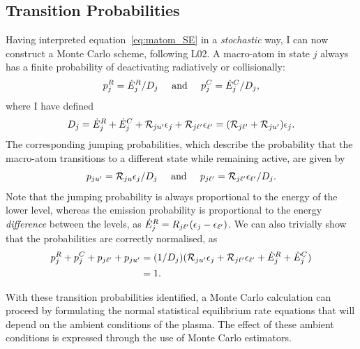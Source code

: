 
\subsection{Transition Probabilities}

Having interpreted equation~\ref{eq:matom_SE} in a {\em stochastic} way,
I can now construct a Monte Carlo scheme, following L02.
A macro-atom in state $j$ always has a finite probability of deactivating
radiatively or collisionally:
\begin{equation}
p_{j}^{R} = \dot{E}_{j}^{R} / D_j \;\;\;\;\; {\rm and} \;\;\;
\;\; p_{j}^{C} = \dot{E}_{j}^{C} / D_j,
\label{eq:deactivate}
\end{equation}
where I have defined
\begin{equation}
D_j =  \dot{E}_{j}^{R}+\dot{E}_{j}^{C}+{\cal R}_{j{u^\prime}}\epsilon_{j}+
 {\cal R}_{j {\ell^\prime}}\epsilon_{{\ell^\prime}} = ({\cal R}_{j{\ell^\prime}} + {\cal R}_{j{u^\prime}}) \epsilon_{j}.
\end{equation}
The corresponding jumping probabilities, which describe the probability
that the macro-atom transitions to a different state while remaining active, 
are given by
\begin{equation}
p_{j{u^\prime}} = {\cal R}_{ju} \epsilon_{j} / D_j \;\;\;\;\; {\rm and} \;\;\;
\;\; p_{j{\ell^\prime}} = {\cal R}_{j{\ell^\prime}} \epsilon_{{\ell^\prime}} / D_j.
\end{equation}
Note that the jumping probability is always proportional to the energy
of the lower level, whereas the emission probability is proportional
to the energy {\em difference} between the levels, as 
$\dot{E}_{j}^{R} = R_{j{\ell^\prime}} (\epsilon_j - \epsilon_{\ell^\prime})$. We can also
trivially show that the probabilities are correctly normalised, as
\begin{align}
p_{j}^{R} + p_{j}^{C} + p_{j{\ell^\prime}} + p_{j{u^\prime}} &=
(1/D_j) ( {\cal R}_{j{u^\prime}} \epsilon_{j} + {\cal R}_{j{\ell^\prime}} \epsilon_{{\ell^\prime}} +
\dot{E}_{j}^{R} + \dot{E}_{j}^{C}) \\
&= 1. \nonumber
\end{align}

With these transition
probabilities identified, a Monte Carlo calculation can proceed by formulating
the normal statistical equilibrium rate equations that will depend on
the ambient conditions of the plasma. The effect of these ambient conditions
is expressed through the use of Monte Carlo estimators.





